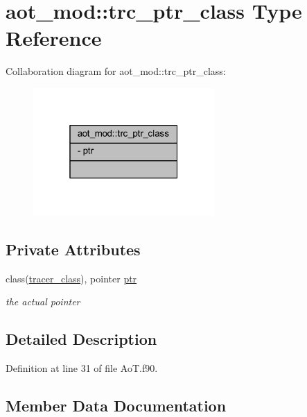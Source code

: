 \hypertarget{structaot__mod_1_1trc__ptr__class}{}\section{aot\+\_\+mod\+:\+:trc\+\_\+ptr\+\_\+class Type Reference}
\label{structaot__mod_1_1trc__ptr__class}


Collaboration diagram for aot\+\_\+mod\+:\+:trc\+\_\+ptr\+\_\+class\+:
\nopagebreak
\begin{figure}[H]
\begin{center}
\leavevmode
\includegraphics[width=196pt]{structaot__mod_1_1trc__ptr__class__coll__graph}
\end{center}
\end{figure}
\subsection*{Private Attributes}
\begin{DoxyCompactItemize}
\item 
class(\mbox{\hyperlink{structtracer__base__mod_1_1tracer__class}{tracer\+\_\+class}}), pointer \mbox{\hyperlink{structaot__mod_1_1trc__ptr__class_a4cbb6cce7f206152dddb514337040125}{ptr}}
\begin{DoxyCompactList}\small\item\em the actual pointer \end{DoxyCompactList}\end{DoxyCompactItemize}


\subsection{Detailed Description}


Definition at line 31 of file Ao\+T.\+f90.



\subsection{Member Data Documentation}
\mbox{\label{structaot__mod_1_1trc__ptr__class_a4cbb6cce7f206152dddb514337040125}} 
